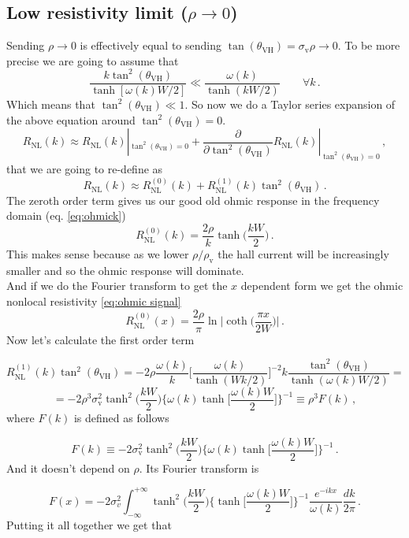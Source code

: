 \subsection{Low resistivity limit ($\rho\to 0$)}
\label{sec:lowrho}
Sending $\rho\to 0$ is effectively equal to sending $\tan(\theta_{\textrm{VH}})=\sigma_{\textrm{v}}\rho\to 0$. To be more precise we are going to assume that
\[
    \frac{k\tan^2(\theta_{\textrm{VH}})}{\tanh[\omega(k)W/2]}\ll \frac{\omega(k)}{\tanh(kW/2)}\quad\quad \forall k \,. 
\]
Which means that $\tan^2(\theta_{\textrm{VH}})\ll 1$. So now we do a Taylor series expansion of the above equation around $\tan^2(\theta_{\textrm{VH}})= 0$.
\[
    R_{\textrm{NL}}(k)\approx R_{\textrm{NL}}(k)|_{\tan^2(\theta_{\textrm{VH}})=0} +
    \frac \partial {\partial \tan^2(\theta_{\textrm{VH}})} R_{\textrm{NL}}(k)|_{\tan^2(\theta_{\textrm{VH}})=0}\,,
\]
that we are going to re-define as
\[
    R_{\textrm{NL}}(k)\approx R_{\textrm{NL}}^{(0)}(k) + R_{\textrm{NL}}^{(1)}(k)\tan^2(\theta_{\textrm{VH}})\,.
\]
The zeroth order term gives us our good old ohmic response in the frequency domain (eq. \ref{eq:ohmick})
\[
    R_{\textrm{NL}}^{(0)}(k)=\frac{2\rho}k\tanh\bigg(\frac{kW}2\bigg)\,.
\]
This makes sense because as we lower $\rho/\rho_{\textrm{v}}$ the hall current will be increasingly smaller and so the ohmic response will dominate.\\
And if we do the Fourier transform to get the $x$ dependent form we get the ohmic nonlocal resistivity \ref{eq:ohmic signal}
\begin{equation}
    R_{\textrm{NL}}^{(0)}(x)=\frac{2\rho}\pi\ln\bigg |\coth \Big(\frac{\pi x}{2W}\Big)\bigg |\,.
\end{equation}
Now let's calculate the first order term

\[
    R_{\textrm{NL}}^{(1)}(k)\tan^2(\theta_{\textrm{VH}})=-2\rho\frac{\omega(k)}k\bigg[\frac{\omega(k)}{\tanh(Wk/2)} \bigg]^{-2}k\frac{\tan^2(\theta_{\textrm{VH}})}{\tanh(\omega(k)W/2)}=
\]
\[
    =-2\rho^3\sigma_{\textrm{v}}^2 \tanh^2\bigg(\frac{kW}2\bigg)\bigg\{\omega(k)\tanh\bigg[\frac{\omega(k) W}2\bigg]\bigg\}^{-1}\equiv
    \rho^3F(k)\,,
\]
where $F(k)$ is defined as follows

\begin{equation}
    F(k)\equiv -2\sigma_{\textrm{v}}^2\tanh^2\bigg(\frac{kW}2\bigg)\bigg\{\omega(k)\tanh\bigg[\frac{\omega(k) W}2\bigg]\bigg\}^{-1}\,.
\end{equation}
And it doesn't depend on $\rho$. Its Fourier transform is 

\begin{equation}
    F(x)=-2\sigma_{v}^2\int_{-\infty}^{+\infty}\tanh^2\bigg(\frac{kW}2\bigg)\bigg\{\tanh\bigg[\frac{\omega(k) W}2\bigg]\bigg\}^{-1}\frac{e^{-ikx}}{\omega(k)}\frac{dk}{2\pi}\,.
\end{equation}
Putting it all together we get that

